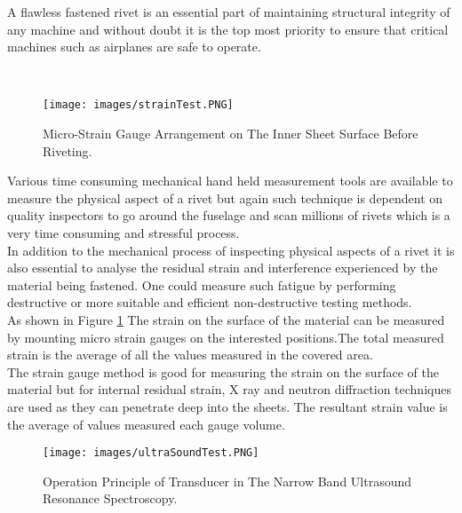\documentclass{article}
\begin{document}
    A flawless fastened rivet is an essential part of maintaining structural integrity of any machine and without doubt it is the top most priority to ensure that critical machines such as airplanes are safe to operate. 
    
    \\
    \begin{figure}[htp]
    \centering
    \texttt{[image: images/strainTest.PNG]}
    \caption{ Micro-Strain Gauge Arrangement on The Inner Sheet Surface Before Riveting.  \cite{inbook}}
    \label{fig: strainGaugeTest}
\end{figure}

    Various time consuming mechanical hand held measurement tools are available to measure the physical aspect of a rivet but again such technique is dependent on quality inspectors to go around the fuselage and scan millions of rivets which is a very time consuming and stressful process.
    \\
    
    In addition to the mechanical process of inspecting physical aspects of a rivet it is also essential to analyse the residual strain and interference experienced by the material being fastened.\cite{inbook} One could measure such fatigue by performing destructive or more suitable and efficient non-destructive testing methods.\\
    
    

    
    As shown in Figure \ref{fig: strainGaugeTest} The strain on the surface of the material can be measured by mounting micro strain gauges on the interested positions.The total measured strain is the average of all the values measured in the covered area.\\
    
    The strain gauge method is good for measuring the strain on the surface of the material but for internal residual strain, X ray and neutron diffraction  techniques are used as they can penetrate deep into the sheets. The resultant strain value is the average of values measured each gauge volume. \cite{inbook} \\
    
    \begin{figure}[htp]
    \centering
    \texttt{[image: images/ultraSoundTest.PNG]}
    \caption{ Operation Principle of Transducer in The Narrow Band Ultrasound Resonance Spectroscopy.  \cite{ultraSoundTest}}
    \label{fig: UltrasoundTest}
\end{figure}
    
\end{document}
